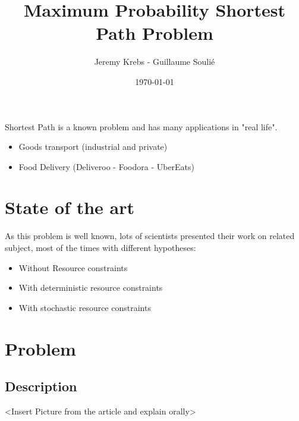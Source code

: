 \documentclass{beamer}
\title{Maximum Probability Shortest Path Problem}
\author{Jeremy Krebs - Guillaume Soulié}
\institute{Université Paris Saclay}
\date{\today}
\begin{document}
\begin{frame}
\titlepage
\end{frame}

\begin{frame}
  \tableofcontents
\end{frame}      

\begin{frame}
Shortest Path is a known problem and has many applications in "real life".

\begin{itemize}
	\item Goods transport (industrial and private)
	\item Food Delivery (Deliveroo - Foodora - UberEats)
\end{itemize}

\end{frame}

\section{State of the art}

\begin{frame}

As this problem is well known, lots of scientists presented their work on related subject, most of the times with different hypotheses:

\begin{itemize}
	\item<2-> Without Resource constraints
	\item<3-> With deterministic resource constraints
	\item<4-> With stochastic resource constraints
\end{itemize}

\end{frame}


\section{Problem}
\subsection{Description}

\begin{frame}
	<Insert Picture from the article and explain orally>
\end{frame}
\end{document}
